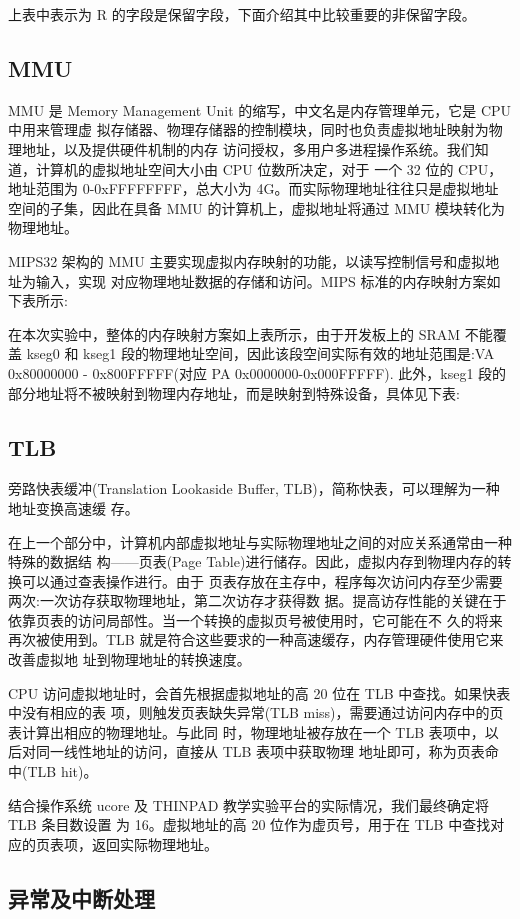 \documentclass[11pt,utf8]{article}
\begin{document}
上表中表示为 R 的字段是保留字段，下面介绍其中比较重要的非保留字段。
\subsection{MMU}
MMU 是 Memory Management Unit 的缩写，中文名是内存管理单元，它是 CPU 中用来管理虚 拟存储器、物理存储器的控制模块，同时也负责虚拟地址映射为物理地址，以及提供硬件机制的内存 访问授权，多用户多进程操作系统。我们知道，计算机的虚拟地址空间大小由 CPU 位数所决定，对于 一个 32 位的 CPU，地址范围为 0-0xFFFFFFFF，总大小为 4G。而实际物理地址往往只是虚拟地址 空间的子集，因此在具备 MMU 的计算机上，虚拟地址将通过 MMU 模块转化为物理地址。

MIPS32 架构的 MMU 主要实现虚拟内存映射的功能，以读写控制信号和虚拟地址为输入，实现 对应物理地址数据的存储和访问。MIPS 标准的内存映射方案如下表所示:

在本次实验中，整体的内存映射方案如上表所示，由于开发板上的 SRAM 不能覆盖 kseg0 和 kseg1 段的物理地址空间，因此该段空间实际有效的地址范围是:VA 0x80000000 - 0x800FFFFF(对应 PA 0x0000000-0x000FFFFF).
此外，kseg1 段的部分地址将不被映射到物理内存地址，而是映射到特殊设备，具体见下表:
\subsection{TLB}

旁路快表缓冲(Translation Lookaside Buffer, TLB)，简称快表，可以理解为一种地址变换高速缓 存。

在上一个部分中，计算机内部虚拟地址与实际物理地址之间的对应关系通常由一种特殊的数据结 构——页表(Page Table)进行储存。因此，虚拟内存到物理内存的转换可以通过查表操作进行。由于 页表存放在主存中，程序每次访问内存至少需要两次:一次访存获取物理地址，第二次访存才获得数 据。提高访存性能的关键在于依靠页表的访问局部性。当一个转换的虚拟页号被使用时，它可能在不 久的将来再次被使用到。TLB 就是符合这些要求的一种高速缓存，内存管理硬件使用它来改善虚拟地 址到物理地址的转换速度。

CPU 访问虚拟地址时，会首先根据虚拟地址的高 20 位在 TLB 中查找。如果快表中没有相应的表 项，则触发页表缺失异常(TLB miss)，需要通过访问内存中的页表计算出相应的物理地址。与此同 时，物理地址被存放在一个 TLB 表项中，以后对同一线性地址的访问，直接从 TLB 表项中获取物理 地址即可，称为页表命中(TLB hit)。

结合操作系统 ucore 及 THINPAD 教学实验平台的实际情况，我们最终确定将 TLB 条目数设置
为 16。虚拟地址的高 20 位作为虚页号，用于在 TLB 中查找对应的页表项，返回实际物理地址。
\subsection{异常及中断处理}
\end{document}

